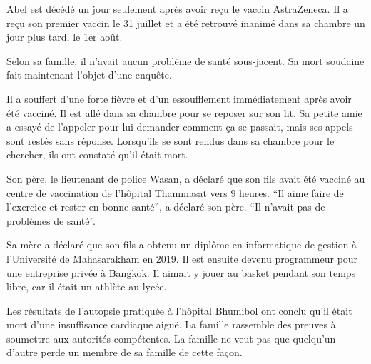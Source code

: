 Abel est décédé un jour seulement après avoir reçu le vaccin AstraZeneca. Il a
reçu son premier vaccin le 31 juillet et a été retrouvé inanimé dans sa chambre
un jour plus tard, le 1er août.

Selon sa famille, il n'avait aucun problème de santé sous-jacent. Sa mort
soudaine fait maintenant l'objet d'une enquête.

Il a souffert d'une forte fièvre et d'un essoufflement immédiatement après avoir
été vacciné. Il est allé dans sa chambre pour se reposer sur son lit. Sa petite
amie a essayé de l'appeler pour lui demander comment ça se passait, mais ses
appels sont restés sans réponse. Lorsqu'ils se sont rendus dans sa chambre pour
le chercher, ils ont constaté qu'il était mort.

Son père, le lieutenant de police Wasan, a déclaré que son fils avait été
vacciné au centre de vaccination de l'hôpital Thammasat vers 9 heures. “Il aime
faire de l'exercice et rester en bonne santé”, a déclaré son père. “Il n'avait
pas de problèmes de santé”.

Sa mère a déclaré que son fils a obtenu un diplôme en informatique de gestion à
l'Université de Mahasarakham en 2019. Il est ensuite devenu programmeur pour une
entreprise privée à Bangkok. Il aimait y jouer au basket pendant son temps
libre, car il était un athlète au lycée.

Les résultats de l'autopsie pratiquée à l'hôpital Bhumibol ont conclu qu'il
était mort d'une insuffisance cardiaque aiguë. La famille rassemble des preuves
à soumettre aux autorités compétentes. La famille ne veut pas que quelqu'un
d'autre perde un membre de sa famille de cette façon.


